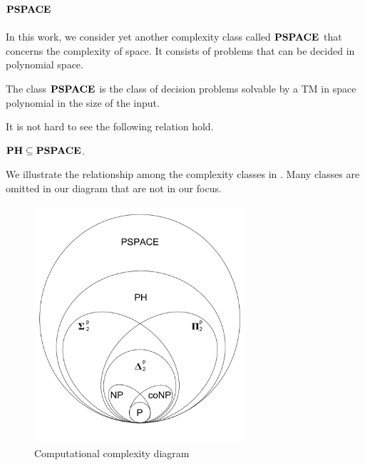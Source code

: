 \subsection{$\textbf{PSPACE}$}
In this work, we consider yet another complexity class called $\textbf{PSPACE}$ that
concerns the complexity of space.
It consists of problems that can be decided in polynomial space.

\begin{definition}
	The class $\textbf{PSPACE}$ is the class of decision problems solvable by a TM
	in space polynomial in the size of the input.
\end{definition}
It is not hard to see the following relation hold.
\begin{center}
	$\textbf{PH} \subseteq \textbf{PSPACE}$.
\end{center}

We illustrate the relationship among the complexity classes in
. Many classes are omitted in our diagram
that are not in our focus.

\begin{figure}[h!]
  \centering
  \includegraphics[width=0.7\textwidth]{img/comp_diagram.pdf}
  \caption{Computational complexity diagram \label{fig:comp_diagram}}
\end{figure}


